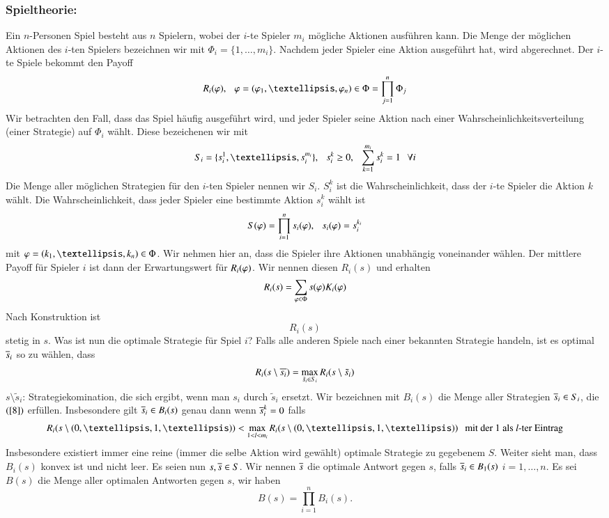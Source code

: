 \subsubsection*{Spieltheorie:}

Ein $n$-Personen Spiel besteht aus $n$ Spielern, wobei der $i$-te Spieler $m_i$ mögliche Aktionen
ausführen kann. Die Menge der möglichen Aktionen des $i$-ten Spielers bezeichnen wir mit
$\Phi_i=\{ 1,…,m_i \}$. Nachdem jeder Spieler eine Aktion ausgeführt hat, wird abgerechnet. Der $i$-te
Spiele bekommt den Payoff
\[
    R_i(\vp), \qq \vp=(\vp_1,…,\vp_n)\in \Phi=\prod_{j=1}^n \Phi_j
\]
Wir betrachten den Fall, dass das Spiel häufig ausgeführt wird, und jeder Spieler seine Aktion nach
einer Wahrscheinlichkeitsverteilung (einer Strategie) auf $\Phi_i $ wählt. Diese bezeichenen wir mit
\[
    S_i=\{s_i^1,…,s_i^{m_i}\},\qq s_i^k\geq 0, \qq \sum_{k=1}^{m_i}s_i^k=1 \qq \forall i
\]
Die Menge aller möglichen Strategien für den $i$-ten Spieler nennen wir $S_i$. $S_i^k$ ist die
Wahrscheinlichkeit, dass der $i$-te Spieler die Aktion $k$ wählt. Die Wahrscheinlichkeit, dass jeder
Spieler eine bestimmte Aktion $s_i^k$ wählt ist
\[
    S(\varphi)=\prod_{i=1}^n s_i(\varphi), \hspace{.25cm} s_i(\varphi)=s_i^{k_i}
\]
mit $\vp=(k_1,…,k_n)\in \Phi$. Wir nehmen hier an, dass die Spieler ihre Aktionen unabhängig voneinander
wählen. Der mittlere Payoff für Spieler $i$ ist dann der Erwartungswert für $R_i(\varphi)$. Wir nennen diesen
$R_i(s)$ und erhalten
\[
    R_i(s)=\sum_{\varphi\in\Phi}s(\varphi) K_i(\varphi)
\]
Nach Konstruktion ist
\[
    R_i(s)
\]
stetig in $s$. Was ist nun die optimale Strategie für Spiel $i$? Falls alle anderen Spiele nach einer
bekannten  Strategie handeln, ist es optimal $\overline{s}_i$ so zu wählen, dass
\begin{align}\label{8}
    R_i(s\setminus \overline{s_i})=\max_{\tilde s_i \in S_i} R_i(s\setminus \tilde s_i)
\end{align}
$s\setminus \tilde s_i$: Strategiekomination, die sich ergibt, wenn man $s_i$ durch  $\tilde s_i$
ersetzt. Wir bezeichnen mit $B_i(s)$ die Menge aller Strategien $\overline s_i\in S_i$, die $(\ref{8})$ erfüllen.
Insbesondere gilt $\overline s_i\in B_i(s)$ genau dann wenn $\overline s_i^k=0$ falls
\[
    R_i(s\setminus (0,…,1,…)) < \max_{1<l<m_i}R_i(s\setminus(0,…,1,…)) \qq \text{mit der 1 als $l$-ter
    Eintrag}
\]
Insbesondere existiert immer eine reine (immer die selbe Aktion wird gewählt) optimale Strategie
zu gegebenem $S$. Weiter sieht man, dass $B_i(s)$ konvex ist und nicht leer. Es seien nun $s,\overline s\in S$.
Wir nennen $\overline s$ die optimale Antwort gegen $s$, falls $\overline s_i\in B_1(s)$ $i=1,…,n$.
Es sei $B(s)$ die Menge aller optimalen Antworten gegen $s$, wir haben
\[
    B(s)=\prod_{i=1}^n B_i(s).
\]

